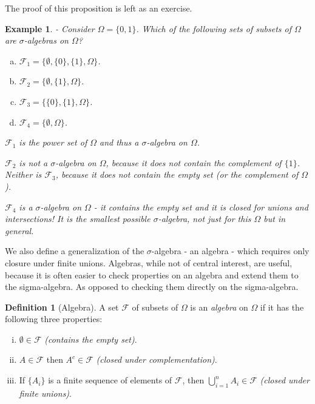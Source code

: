 \documentclass{book}
\theoremstyle{plain}%
\newtheorem{prototheorem}{Example}[section]
\newenvironment{cexample}
   {\colorlet{shadecolor}{gray!10}\begin{shaded}\begin{prototheorem}}
   {\end{prototheorem}\end{shaded}}
\theoremstyle{definition}
\newtheorem{definition}{Definition}[section]
\begin{document}
The proof of this proposition is left as an exercise.

\begin{cexample}{}{-}
Consider $\Omega = \{0, 1\}$. Which of the following sets of subsets of $\Omega$ are $\sigma$-algebras on $\Omega$?

\begin{enumerate}[(a)]
\item $\mathcal{F}_1 = \{\emptyset, \{0\}, \{1\},\Omega\}$. 
\item $\mathcal{F}_2 = \{\emptyset, \{1\},\Omega\}$.
\item $\mathcal{F}_3 = \{\{0\}, \{1\},\Omega\}$.
\item $\mathcal{F}_4 = \{\emptyset, \Omega\}$. 
\end{enumerate}

$\mathcal{F}_1$ is the power set of $\Omega$ and thus a $\sigma$-algebra on $\Omega$.

$\mathcal{F}_2$ is not a $\sigma$-algebra on $\Omega$, because it does not contain the complement of $\{1\}$. Neither is $\mathcal{F}_3$, because it does not contain the empty set (or the complement of $\Omega$).

$\mathcal{F}_4$ is a $\sigma$-algebra on $\Omega$ - it contains the empty set and it is closed for unions and intersections! It is the smallest possible $\sigma$-algebra, not just for this $\Omega$ but in general.

\end{cexample}

We also define a generalization of the $\sigma$-algebra - an algebra - which requires only closure under finite unions. Algebras, while not of central interest, are useful, because it is often easier to check properties on an algebra and extend them to the sigma-algebra. As opposed to checking them directly on the sigma-algebra.

\begin{definition}[Algebra]
A set $\mathcal{F}$ of subsets of $\Omega$ is an \emph{algebra} on $\Omega$ if it has the following three properties:

\begin{enumerate}[(i)]
\item $\emptyset \in  \mathcal{F}$ \textit{(contains the empty set)}.
\item $A \in \mathcal{F}$ then $A^c \in \mathcal{F}$ \textit{(closed under complementation)}.
\item If $\{A_i\}$ is a finite sequence of elements of $\mathcal{F}$,  then $\bigcup_{i=1}^n A_i \in \mathcal{F}$ \textit{(closed under finite unions)}.
\end{enumerate}
\end{definition}
\end{document}
